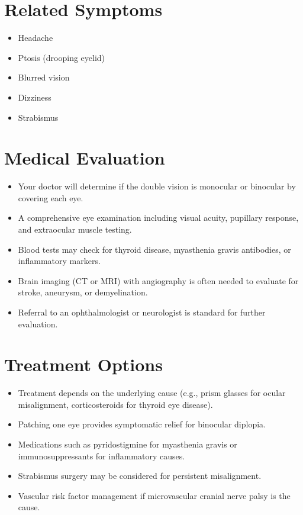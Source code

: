 \section*{Related Symptoms}
\begin{itemize}
  \item Headache
  \item Ptosis (drooping eyelid)
  \item Blurred vision
  \item Dizziness
  \item Strabismus
\end{itemize}

\section*{Medical Evaluation}
\begin{itemize}
  \item Your doctor will determine if the double vision is monocular or binocular by covering each eye.
  \item A comprehensive eye examination including visual acuity, pupillary response, and extraocular muscle testing.
  \item Blood tests may check for thyroid disease, myasthenia gravis antibodies, or inflammatory markers.
  \item Brain imaging (CT or MRI) with angiography is often needed to evaluate for stroke, aneurysm, or demyelination.
  \item Referral to an ophthalmologist or neurologist is standard for further evaluation.
\end{itemize}

\section*{Treatment Options}
\begin{itemize}
  \item Treatment depends on the underlying cause (e.g., prism glasses for ocular misalignment, corticosteroids for thyroid eye disease).
  \item Patching one eye provides symptomatic relief for binocular diplopia.
  \item Medications such as pyridostigmine for myasthenia gravis or immunosuppressants for inflammatory causes.
  \item Strabismus surgery may be considered for persistent misalignment.
  \item Vascular risk factor management if microvascular cranial nerve palsy is the cause.
\end{itemize}

